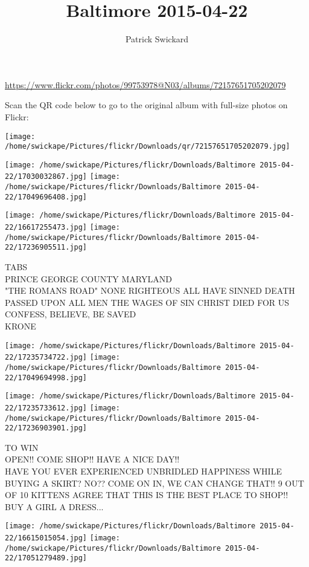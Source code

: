 \documentclass[10pt,letterpaper]{article}
\title{Baltimore 2015-04-22}
\author{Patrick Swickard}
\date{}
\begin{document}
\maketitle

\url{https://www.flickr.com/photos/99753978@N03/albums/72157651705202079}

Scan the QR code below to go to the original album with full-size photos on Flickr:

\texttt{[image: /home/swickape/Pictures/flickr/Downloads/qr/72157651705202079.jpg]}
\pagebreak

\texttt{[image: /home/swickape/Pictures/flickr/Downloads/Baltimore 2015-04-22/17030032867.jpg]}
\texttt{[image: /home/swickape/Pictures/flickr/Downloads/Baltimore 2015-04-22/17049696408.jpg]}

\texttt{[image: /home/swickape/Pictures/flickr/Downloads/Baltimore 2015-04-22/16617255473.jpg]}
\texttt{[image: /home/swickape/Pictures/flickr/Downloads/Baltimore 2015-04-22/17236905511.jpg]}

TABS\\
PRINCE GEORGE COUNTY MARYLAND\\
"THE ROMANS ROAD" NONE RIGHTEOUS ALL HAVE SINNED DEATH PASSED UPON ALL MEN THE WAGES OF SIN CHRIST DIED FOR US CONFESS, BELIEVE, BE SAVED\\
KRONE
\pagebreak

\texttt{[image: /home/swickape/Pictures/flickr/Downloads/Baltimore 2015-04-22/17235734722.jpg]}
\texttt{[image: /home/swickape/Pictures/flickr/Downloads/Baltimore 2015-04-22/17049694998.jpg]}

\texttt{[image: /home/swickape/Pictures/flickr/Downloads/Baltimore 2015-04-22/17235733612.jpg]}
\texttt{[image: /home/swickape/Pictures/flickr/Downloads/Baltimore 2015-04-22/17236903901.jpg]}

TO WIN\\
OPEN!!  COME SHOP!!  HAVE A NICE DAY!!\\
HAVE YOU EVER EXPERIENCED UNBRIDLED HAPPINESS WHILE BUYING A SKIRT?  NO??  COME ON IN, WE CAN CHANGE THAT!!  9 OUT OF 10 KITTENS AGREE THAT THIS IS THE BEST PLACE TO SHOP!!\\
BUY A GIRL A DRESS...
\pagebreak

\texttt{[image: /home/swickape/Pictures/flickr/Downloads/Baltimore 2015-04-22/16615015054.jpg]}
\texttt{[image: /home/swickape/Pictures/flickr/Downloads/Baltimore 2015-04-22/17051279489.jpg]}
\end{document}
